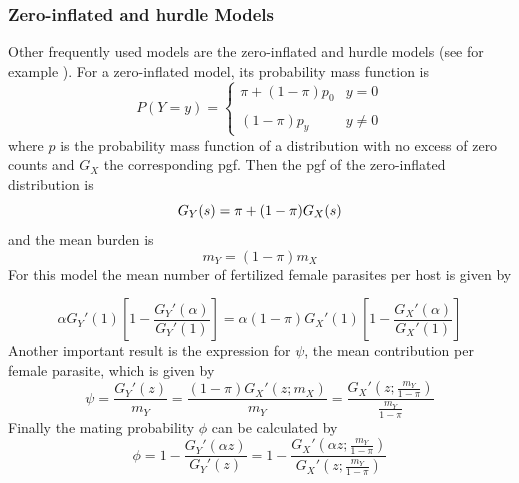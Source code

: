 \documentclass[12pt,a4paper]{article}
\theoremstyle{plain}%
\theoremstyle{definition}
\theoremstyle{remark}
\begin{document}
	\subsubsection{Zero-inflated and hurdle Models}
	Other frequently used models  are the zero-inflated and hurdle models (see for example  \citep{abdybekova2012frequency,crofton1971quantitative,denwood2008distribution,ziadinov2010frequency}).
	For a zero-inflated model, its probability mass function is 
	\begin{equation*}\label{zid}
	P(Y=y)= \left\{ \begin{array}{lc}
	\pi + (1-\pi)p_0 & y=0 \\
	\\ (1-\pi)p_y  & y\neq 0
	\end{array}
	\right.
	\end{equation*}
	where $p$ is the probability mass function of a distribution with no excess of zero counts and $G_X$ the corresponding pgf. 
	Then the pgf of the zero-inflated distribution is
	\begin{equation*}
	G_Y(s)=\pi+(1-\pi)G_X(s)\\
	\end{equation*}
	and the mean burden is  %
		\begin{equation*}
	m_Y=(1-\pi)m_X
	\end{equation*}
	For this model the mean number of fertilized female parasites per host is given by
	

	\begin{equation*}
	\alpha G_Y'(1) \left[1-  \frac{G_Y'(\alpha )}{ G_Y'(1)}\right]=\alpha (1-\pi) G_X'(1) 
	\left[1 - \frac{G_X'(\alpha)}{G_X'(1)}\right]    
	\end{equation*}
	Another important result is the expression for $\psi$, the mean contribution per female parasite, which is given by
	\begin{equation}\label{zipsi}
	\psi= \frac{G_Y'(z)}{m_Y}=  \frac{(1-\pi)G_X'(z;m_X)}{m_Y}=\frac{G_X'\left( z;\frac{m_Y}{1-\pi}\right) }{\frac{m_Y}{1-\pi}} 
	\end{equation}
	Finally the mating probability $\phi$ can be calculated by     
	\begin{equation}\label{ziphi}
	\phi=1-\frac{G_Y'(\alpha z)}{G_Y'(z)}=1-\frac{G_X'\left(\alpha z;\frac{m_Y}{1-\pi}\right)}{G_X'\left( z;\frac{m_Y}{1-\pi}\right)} 
	\end{equation}
	
\end{document}
